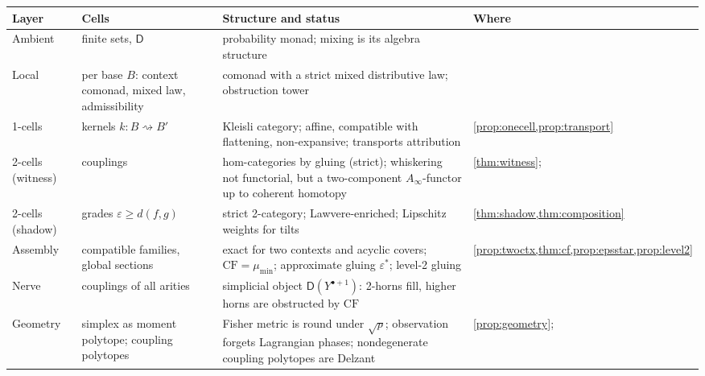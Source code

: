 \documentclass[11pt]{article}
\theoremstyle{definition}
\theoremstyle{remark}
\newcommand{\D}{\mathsf{D}}
\begin{document}
\begin{center}\small
\begin{tabular}{@{}R{0.13\textwidth}R{0.24\textwidth}R{0.37\textwidth}R{0.17\textwidth}@{}}
\toprule
Layer & Cells & Structure and status & Where\\
\midrule
Ambient & finite sets, $\D$ & probability monad; mixing is its algebra structure & \cite{Awasthi-Tower}\\
Local & per base $B$: context comonad, mixed law, admissibility & comonad with a strict mixed
distributive law; obstruction tower & \cite[\S\S9--10]{Awasthi-Tower}\\
1-cells & kernels $k\colon B\rightsquigarrow B'$ & Kleisli category; affine, compatible with flattening,
non-expansive; transports attribution & \cref{prop:onecell,prop:transport}\\
2-cells (witness) & couplings & hom-categories by gluing (strict); whiskering not functorial, but a
two-component $A_\infty$-functor up to coherent homotopy & \cref{thm:witness}; \cite[Thm.~5.2]{Awasthi-Conditionals}\\
2-cells (shadow) & grades $\varepsilon\ge d(f,g)$ & strict 2-category; Lawvere-enriched; Lipschitz
weights for tilts & \cref{thm:shadow,thm:composition}\\
Assembly & compatible families, global sections & exact for two contexts and acyclic covers;
$\mathrm{CF}=\mu_{\min}$; approximate gluing $\varepsilon^*$; level-2 gluing &
\cref{prop:twoctx,thm:cf,prop:epsstar,prop:level2}\\
Nerve & couplings of all arities & simplicial object $\D(Y^{\bullet+1})$: 2-horns fill, higher horns are obstructed
by $\mathrm{CF}$ & \cite[\S4]{Awasthi-Conditionals}\\
Geometry & simplex as moment polytope; coupling polytopes & Fisher metric is round under $\sqrt p$; observation forgets
Lagrangian phases; nondegenerate coupling polytopes are Delzant & \cref{prop:geometry}; \cite[\S6]{Awasthi-Conditionals}\\
\bottomrule
\end{tabular}
\end{center}
\end{document}
